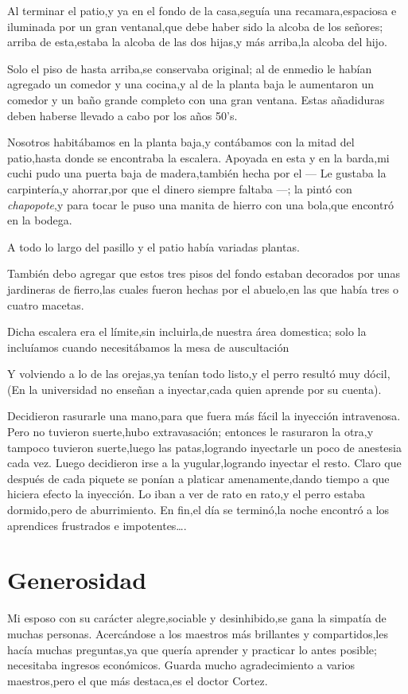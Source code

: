 \documentclass[letterpaper,12pt]{book}
\begin{document}
Al terminar el patio,y ya en el fondo de la casa,seguía una recamara,espaciosa e iluminada por un gran ventanal,que debe haber sido la alcoba de los señores; arriba de esta,estaba la alcoba de las dos hijas,y más arriba,la alcoba del hijo.

Solo el piso de hasta arriba,se conservaba original; al de enmedio le habían agregado un comedor y una cocina,y al de la planta baja le aumentaron un comedor y un baño grande completo con una gran ventana. Estas añadiduras deben haberse llevado a cabo por los años 50's. 

Nosotros habitábamos en la planta baja,y contábamos con la mitad del patio,hasta donde se encontraba la escalera. Apoyada en esta y en la barda,mi cuchi pudo una puerta baja de madera,también hecha por el --- Le gustaba la carpintería,y ahorrar,por que el dinero siempre faltaba ---; la pintó con \textit{chapopote},y para tocar le puso una manita de hierro con una bola,que encontró en la bodega.

A todo lo largo del pasillo y el patio había variadas plantas. 

También debo agregar que estos tres pisos del fondo estaban decorados por unas jardineras de fierro,las cuales fueron hechas por el abuelo,en las que había tres o cuatro macetas. 

Dicha escalera era el límite,sin incluirla,de nuestra área domestica; solo la incluíamos cuando necesitábamos la mesa de auscultación

Y volviendo a lo de las orejas,ya tenían todo listo,y el perro resultó muy dócil, (En la universidad no enseñan a inyectar,cada quien aprende por su cuenta).

Decidieron rasurarle una mano,para que fuera más fácil la inyección intravenosa. Pero no tuvieron suerte,hubo extravasación; entonces le rasuraron la otra,y tampoco tuvieron suerte,luego las patas,logrando inyectarle un poco de anestesia cada vez. Luego decidieron  irse a la yugular,logrando inyectar el resto. Claro que después de cada piquete se ponían a platicar amenamente,dando tiempo a que hiciera efecto la inyección. Lo iban a ver de rato en rato,y el perro estaba dormido,pero de aburrimiento. En fin,el día se terminó,la noche encontró a los aprendices frustrados e impotentes\ldots.

\chapter{Generosidad}
Mi esposo con su carácter alegre,sociable y desinhibido,se gana la simpatía de muchas personas. Acercándose a los maestros más brillantes y compartidos,les hacía muchas preguntas,ya que quería aprender y practicar lo antes posible; necesitaba ingresos económicos. Guarda mucho agradecimiento a varios maestros,pero el que más destaca,es el doctor Cortez.
\end{document}
